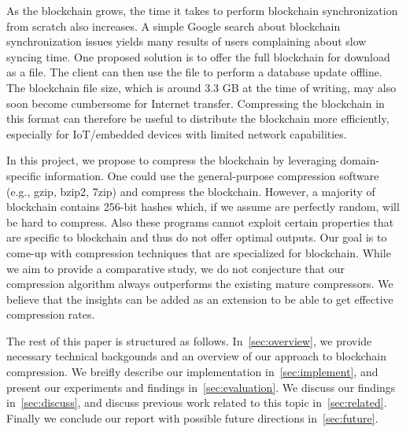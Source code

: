 As the blockchain grows, the time it takes to perform blockchain synchronization from scratch also increases.
A simple Google search about \eth{} blockchain synchronization issues yields many results of users complaining about slow syncing time.
One proposed solution is to offer the full blockchain for download as a file.
The client can then use the file to perform a database update offline.
The blockchain file size, which is around 3.3 GB at the time of writing, may also soon become cumbersome for Internet transfer.
Compressing the blockchain in this format can therefore be useful to distribute the blockchain more efficiently,
especially for IoT/embedded devices with limited network capabilities.

In this project, we propose to compress the \eth{} blockchain by leveraging domain-specific information.
One could use the general-purpose compression software (e.g., gzip, bzip2, 7zip) and compress the blockchain.
However, a majority of blockchain contains 256-bit hashes which, if we assume are perfectly random, will be hard to compress.
Also these programs cannot exploit certain properties that are specific to blockchain and thus do not offer optimal outputs.
Our goal is to come-up with compression techniques that  are specialized for blockchain.
While we aim to provide a comparative study, we do not conjecture that our compression algorithm always outperforms the
existing mature compressors.
We believe that the insights can be added as an extension to be able to get effective compression rates.

The rest of this paper is structured as follows. In~\autoref{sec:overview}, we provide necessary technical backgounds
and an overview of our approach to \eth{} blockchain compression. We breifly describe our implementation in~\autoref{sec:implement},
and present our experiments and findings in~\autoref{sec:evaluation}. We discuss our findings in~\autoref{sec:discuss}, and discuss previous work related to this topic in~\autoref{sec:related}. Finally we conclude our report with possible future directions in~\autoref{sec:future}.

